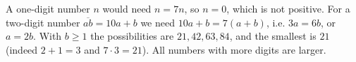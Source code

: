A one-digit number $n$ would need $n=7n$, so $n=0$, which is not positive. For a two-digit number $\overline{ab}=10a+b$ we need $10a+b=7(a+b)$, i.e. $3a=6b$, or $a=2b$. With $b\ge1$ the possibilities are $21,42,63,84$, and the smallest is $\boxed{21}$ (indeed $2+1=3$ and $7\cdot3=21$). All numbers with more digits are larger.
